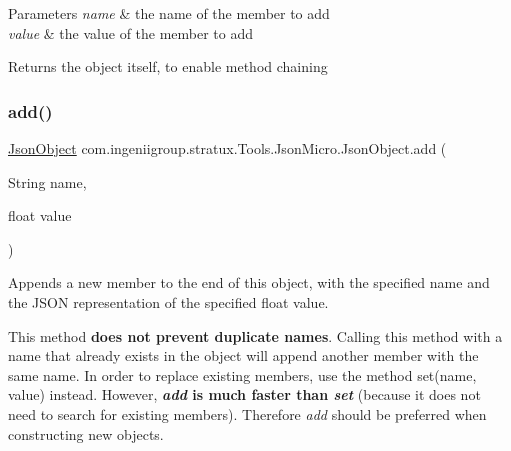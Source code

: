 \begin{DoxyParams}{Parameters}
{\em name} & the name of the member to add \\
\hline
{\em value} & the value of the member to add \\
\hline
\end{DoxyParams}
\begin{DoxyReturn}{Returns}
the object itself, to enable method chaining 
\end{DoxyReturn}
\mbox{\label{classcom_1_1ingeniigroup_1_1stratux_1_1_tools_1_1_json_micro_1_1_json_object_a179bb7c4e41e42181ae247f36e4d4f50}} 
\subsubsection{\texorpdfstring{add()}{add()}\hspace{0.1cm}{\footnotesize\ttfamily [3/7]}}
{\footnotesize\ttfamily \hyperlink{classcom_1_1ingeniigroup_1_1stratux_1_1_tools_1_1_json_micro_1_1_json_object}{Json\+Object} com.\+ingeniigroup.\+stratux.\+Tools.\+Json\+Micro.\+Json\+Object.\+add (\begin{DoxyParamCaption}\item[{String}]{name,  }\item[{float}]{value }\end{DoxyParamCaption})}

Appends a new member to the end of this object, with the specified name and the J\+S\+ON representation of the specified {\ttfamily float} value. 

This method {\bfseries does not prevent duplicate names}. Calling this method with a name that already exists in the object will append another member with the same name. In order to replace existing members, use the method {\ttfamily set(name, value)} instead. However, {\bfseries  {\itshape add} is much faster than {\itshape set}} (because it does not need to search for existing members). Therefore {\itshape add} should be preferred when constructing new objects. 


